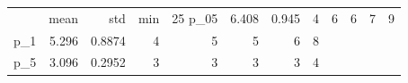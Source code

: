 \begin{tabular}{lrrrrrrr}
\toprule
 & mean & std & min & 25%
\midrule
p_05 & 6.408 & 0.945 & 4 & 6 & 6 & 7 & 9 \\
p_1 & 5.296 & 0.8874 & 4 & 5 & 5 & 6 & 8 \\
p_5 & 3.096 & 0.2952 & 3 & 3 & 3 & 3 & 4 \\
\bottomrule
\end{tabular}
